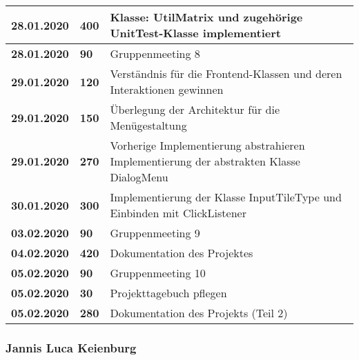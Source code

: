 {\begin{longtable}{|l|l|p{11cm}|}
		\textbf{28.01.2020} 
		& \textbf{\hfill400} & Klasse: UtilMatrix und zugehörige UnitTest-Klasse implementiert
		\\ \hline
		
		\textbf{28.01.2020} 
		& \textbf{\hfill90} & Gruppenmeeting 8
		\\ \hline
		
		\textbf{29.01.2020} 
		& \textbf{\hfill120} & Verständnis für die Frontend-Klassen und deren Interaktionen gewinnen
		\\ \hline
		
		\textbf{29.01.2020} 
		& \textbf{\hfill150} & Überlegung der Architektur für die Menügestaltung
		\\ \hline
		
		\textbf{29.01.2020} 
		& \textbf{\hfill270} & Vorherige Implementierung abstrahieren 
			Implementierung der abstrakten Klasse DialogMenu
		\\ \hline
		
		\textbf{30.01.2020} 
		& \textbf{\hfill300} & Implementierung der Klasse InputTileType und Einbinden mit ClickListener
		\\ \hline
		
		\textbf{03.02.2020} 
		& \textbf{\hfill90} & Gruppenmeeting 9
		\\ \hline
		
		\textbf{04.02.2020} 
		& \textbf{\hfill420} & Dokumentation des Projektes
		\\ \hline
		
		\textbf{05.02.2020} 
		& \textbf{\hfill90} & Gruppenmeeting 10
		\\ \hline
		
		\textbf{05.02.2020} 
		& \textbf{\hfill30} & Projekttagebuch pflegen
		\\ \hline
		
		\textbf{05.02.2020} 
		& \textbf{\hfill280} & Dokumentation des Projekts (Teil 2)	
		\\ \hline\hline
		
	\end{longtable}
}

\clearpage

\subsubsection{Jannis Luca Keienburg}


